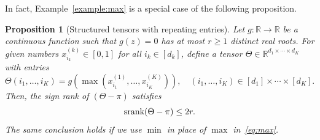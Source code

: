 \documentclass[11pt]{article}
\theoremstyle{plain}
\newtheorem{prop}{Proposition}[section]
\theoremstyle{definition}
\def\srank{\textup{srank}}
\begin{document}
In fact, Example~\ref{example:max} is a special case of the following proposition. 

\begin{prop}[Structured tensors with repeating entries]\label{prop:repeat}Let $g\colon \mathbb{R}\to \mathbb{R}$ be a continuous function such that $g(z)=0$ has at most $r\geq 1$ distinct real roots. For given numbers $x^{(k)}_{i_k}\in[0,1]$ for all $i_k\in[d_k]$, define a tensor $\Theta\in\mathbb{R}^{d_1\times\cdots \times d_K}$ with entries 
\begin{equation}\label{eq:max}
\Theta(i_1,\ldots,i_K)=g(\max(x^{(1)}_{i_1},\ldots,x^{(K)}_{i_K})),\quad (i_1,\ldots,i_K)\in[d_1]\times\cdots\times[d_K].
\end{equation}
Then, the sign rank of $(\Theta-\pi)$ satisfies
\[
\srank(\Theta-\pi)\leq 2r.
\]
The same conclusion holds if we use $\min$ in place of $\max$ in~\eqref{eq:max}. 
\end{prop}
\end{document}
